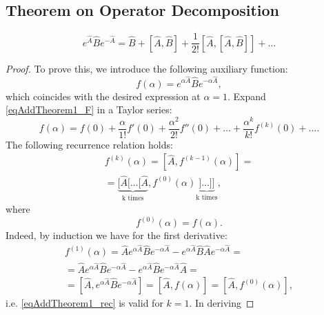 \subsection{Theorem on Operator Decomposition}
\begin{theorem}
\label{thm:addoperatorequality}
\begin{equation}
e^{\hat{A}}\hat{B}e^{-\hat{A}} = 
\hat{B} + \left[\hat{A},\hat{B}\right] + 
\frac{1}{2!} \left[\hat{A},\left[\hat{A},\hat{B}\right]\right] + \dots
\label{eqAddTheorem1_Main}
\end{equation}
\begin{proof}
To prove this, we introduce the following auxiliary function:
\begin{equation}
f\left(\alpha\right) = 
e^{\alpha\hat{A}}\hat{B}e^{-\alpha\hat{A}},
\label{eqAddTheorem1_F}
\end{equation}
which coincides with the desired expression at $\alpha = 1$. Expand
\eqref{eqAddTheorem1_F} in a Taylor series:
\begin{equation}
f\left(\alpha\right) = 
f\left(0\right) + \frac{\alpha}{1!}f'\left(0\right) +
\frac{\alpha^2}{2!}f''\left(0\right) + 
\dots +
\frac{\alpha^k}{k!}f^{(k)}\left(0\right) + \dots.
\label{eqAddTheorem1_T}
\end{equation}
The following recurrence relation holds:
\begin{eqnarray}
f^{(k)}\left(\alpha\right) = \left[\hat{A},
  f^{(k-1)}\left(\alpha\right)\right] = 
\nonumber \\
=
\underbrace{
[\hat{A}[\dots[\hat{A}}_{\mbox{k
  times}},
f^{(0)}\left(\alpha\right)
\underbrace{]\dots]]}_{\mbox{k
  times}},
\label{eqAddTheorem1_rec}
\end{eqnarray}
where 
\[
f^{(0)}\left(\alpha\right) = f\left(\alpha\right).
\]
Indeed, by induction we have for the first derivative:
\begin{eqnarray}
f^{(1)}\left(\alpha\right) = \hat{A}
  e^{\alpha\hat{A}}\hat{B}e^{-\alpha\hat{A}} -
  e^{\alpha\hat{A}}\hat{B}\hat{A}e^{-\alpha\hat{A}} = 
\nonumber \\
= \hat{A}
  e^{\alpha\hat{A}}\hat{B}e^{-\alpha\hat{A}} -
  e^{\alpha\hat{A}}\hat{B}e^{-\alpha\hat{A}}\hat{A} = 
\nonumber \\
=
\left[\hat{A}, e^{\alpha\hat{A}}\hat{B}e^{-\alpha\hat{A}}\right] = 
\left[\hat{A}, f\left(\alpha\right)\right] = 
\left[\hat{A}, f^{(0)}\left(\alpha\right)\right],
\label{eqAddTheorem1_rec_1}
\end{eqnarray}
i.e. \eqref{eqAddTheorem1_rec} is valid for $k = 1$. In deriving

\end{proof}
\end{theorem}
